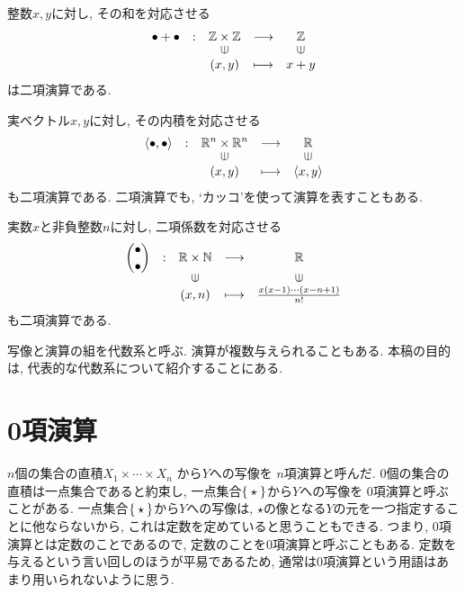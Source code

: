 \begin{example}
  整数$x,y$に対し, その和を対応させる
  \begin{align*}
    \shazo{\bullet+\bullet}
          {\ZZ\times \ZZ}{\ZZ}
          {(x,y)}{x+y}
  \end{align*}
  は二項演算である.
\end{example}
\begin{example}
  実ベクトル$x,y$に対し, その内積を対応させる
  \begin{align*}
    \shazo{\Braket{\bullet,\bullet}}
          {\RR^n\times \RR^n}{\RR}
          {(x,y)}{\Braket{x,y}}
  \end{align*}
  も二項演算である.
  二項演算でも, `カッコ'を使って演算を表すこともある.
\end{example}

\begin{example}
  実数$x$と非負整数$n$に対し,
  二項係数を対応させる
  \begin{align*}
    \shazo{\binom{\bullet}{\bullet}}
          {\RR\times \NN}{\RR}
          {(x,n)}{\frac{x(x-1)\cdots(x-n+1)}{n!}}
  \end{align*}
  も二項演算である.
\end{example}

写像と演算の組を代数系と呼ぶ.
演算が複数与えられることもある.
本稿の目的は,
代表的な代数系について紹介することにある.

\section{0項演算}
$n$個の集合の直積$X_1\times \cdots \times X_n$
から$Y$への写像を
$n$項演算と呼んだ.
$0$個の集合の直積は一点集合であると約束し,
一点集合$\Set{\star}$から$Y$への写像を
$0$項演算と呼ぶことがある.
一点集合$\Set{\star}$から$Y$への写像は,
$\star$の像となる$Y$の元を一つ指定することに他ならないから,
これは定数を定めていると思うこともできる.
つまり, $0$項演算とは定数のことであるので,
定数のことを$0$項演算と呼ぶこともある.
定数を与えるという言い回しのほうが平易であるため,
通常は$0$項演算という用語はあまり用いられないように思う.


